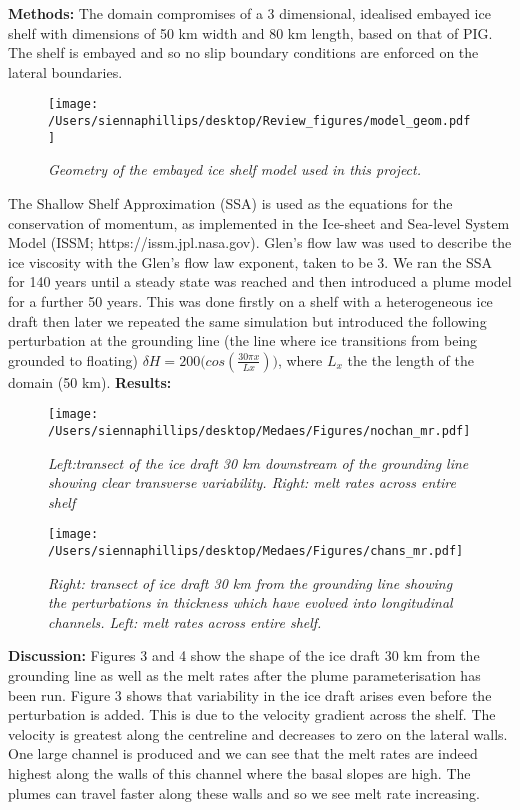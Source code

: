\documentclass[10pt]{article}{\twocolumn}
\begin{document}
\indent
\textbf{Methods:}
The domain compromises of a 3 dimensional, idealised embayed ice shelf with dimensions of 50 km width and 80 km length, based on that of PIG. The shelf is embayed and so no slip boundary conditions are enforced on the lateral boundaries.
\begin{figure}[htbp]
\begin{center}
\texttt{[image: /Users/siennaphillips/desktop/Review\_figures/model\_geom.pdf]}
\caption{\textit{Geometry of the embayed ice shelf model used in this project.}}
\label{default}
\end{center}
\end{figure}
\newline
The Shallow Shelf Approximation (SSA) is used as the equations for the conservation of momentum, as implemented in the Ice-sheet and Sea-level System Model 
\newline
(ISSM; https://issm.jpl.nasa.gov).
Glen's flow law was used to describe the ice viscosity with the Glen's flow law exponent, taken to be 3.
We ran the SSA for 140 years until a steady state was reached and then introduced a plume model for a further 50 years. This was done firstly on a shelf with a heterogeneous ice draft then later we repeated the same simulation but introduced the following perturbation at the grounding line (the line where ice transitions from being grounded to floating) \begin{math} \delta H=200\bigg(cos(\frac{30\pi x}{Lx})\bigg)\end{math}, where \begin{math}L_{x}\end{math} the the length of the domain (50 km).
\newpage
\indent
\textbf{Results:}
\begin{figure}[H]
\texttt{[image: /Users/siennaphillips/desktop/Medaes/Figures/nochan\_mr.pdf]}
\caption{\textit{Left:transect of the ice draft 30 km downstream of the grounding line showing clear transverse variability. Right: melt rates across entire shelf}}
\label{default}
\end{figure}
\begin{figure}[htbp]
\texttt{[image: /Users/siennaphillips/desktop/Medaes/Figures/chans\_mr.pdf]}
\caption{\textit{Right: transect of ice draft 30 km from the grounding line showing the perturbations in thickness which have evolved into longitudinal channels. Left: melt rates across entire shelf.}}
\label{default}
\end{figure}
\textbf{Discussion:}
Figures 3 and 4 show the shape of the ice draft 30 km from the grounding line as well as the melt rates after the plume parameterisation has been run. Figure 3 shows that variability in the ice draft arises even before the perturbation is added. This is due to the velocity gradient across the shelf. The velocity is greatest along the centreline and decreases to zero on the lateral walls. One large channel is produced and we can see that the melt rates are indeed highest along the walls of this channel where the basal slopes are high. The plumes can travel faster along these walls and so we see melt rate increasing. 
\end{document}
